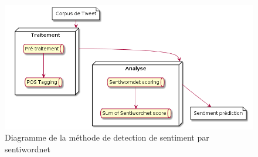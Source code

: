 \begin{figure}[h!]
	\centerline{\includegraphics[scale=0.6]{img/DIagSentiwordnet.png}}
	\caption{Diagramme de la méthode de detection de sentiment par sentiwordnet}
\end{figure}